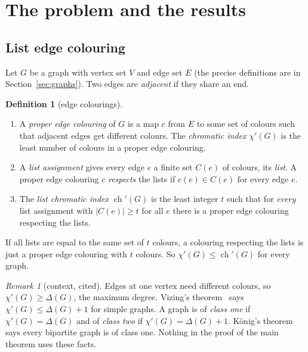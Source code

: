 \documentclass[11pt]{article}
\theoremstyle{plain}
\theoremstyle{definition}
\newtheorem{definition}[theorem]{Definition}
\theoremstyle{remark}
\newtheorem{remark}[theorem]{Remark}
\newcommand{\chil}{\operatorname{ch}'}
\newcommand{\chie}{\chi'}
\begin{document}
\section{The problem and the results}\label{sec:results}

\subsection{List edge colouring}

Let $G$ be a graph with vertex set $V$ and edge set $E$ (the precise definitions are in
Section~\ref{sec:graphs}). Two edges are \emph{adjacent} if they share an end.

\begin{definition}[edge colourings]
\begin{enumerate}[label=(\alph*)]
  \item A \emph{proper edge colouring} of $G$ is a map $c$ from $E$ to some set of colours such
    that adjacent edges get different colours. The \emph{chromatic index} $\chie(G)$ is the
    least number of colours in a proper edge colouring.
  \item A \emph{list assignment} gives every edge $e$ a finite set $C(e)$ of colours, its
    \emph{list}. A proper edge colouring $c$ \emph{respects} the lists if $c(e)\in C(e)$ for
    every edge $e$.
  \item The \emph{list chromatic index} $\chil(G)$ is the least integer $t$ such that for
    \emph{every} list assignment with $|C(e)|\ge t$ for all $e$ there is a proper edge colouring
    respecting the lists.
\end{enumerate}
\end{definition}

If all lists are equal to the same set of $t$ colours, a colouring respecting the lists is just
a proper edge colouring with $t$ colours. So $\chie(G)\le\chil(G)$ for every graph.

\begin{remark}[context, cited]
Edges at one vertex need different colours, so $\chie(G)\ge\Delta(G)$, the maximum degree.
Vizing's theorem~\cite{vizing} says $\chie(G)\le\Delta(G)+1$ for simple graphs. A graph is of
\emph{class one} if $\chie(G)=\Delta(G)$ and of \emph{class two} if $\chie(G)=\Delta(G)+1$.
König's theorem~\cite{konig} says every bipartite graph is of class one. Nothing in the proof
of the main theorem uses these facts.
\end{remark}
\end{document}
